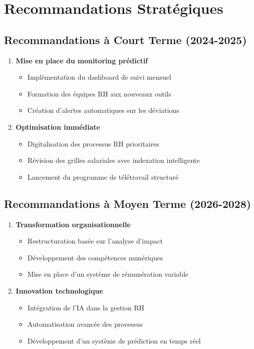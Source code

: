 \documentclass[12pt,a4paper]{article}
\begin{document}
\newpage

\section{Recommandations Stratégiques}

\subsection{Recommandations à Court Terme (2024-2025)}
\begin{enumerate}
    \item \textbf{Mise en place du monitoring prédictif}
    \begin{itemize}
        \item Implémentation du dashboard de suivi mensuel
        \item Formation des équipes RH aux nouveaux outils
        \item Création d'alertes automatiques sur les déviations
    \end{itemize}
    
    \item \textbf{Optimisation immédiate}
    \begin{itemize}
        \item Digitalisation des processus RH prioritaires
        \item Révision des grilles salariales avec indexation intelligente
        \item Lancement du programme de télétravail structuré
    \end{itemize}
\end{enumerate}

\subsection{Recommandations à Moyen Terme (2026-2028)}
\begin{enumerate}
    \item \textbf{Transformation organisationnelle}
    \begin{itemize}
        \item Restructuration basée sur l'analyse d'impact
        \item Développement des compétences numériques
        \item Mise en place d'un système de rémunération variable
    \end{itemize}
    
    \item \textbf{Innovation technologique}
    \begin{itemize}
        \item Intégration de l'IA dans la gestion RH
        \item Automatisation avancée des processus
        \item Développement d'un système de prédiction en temps réel
    \end{itemize}
\end{enumerate}
\end{document}
